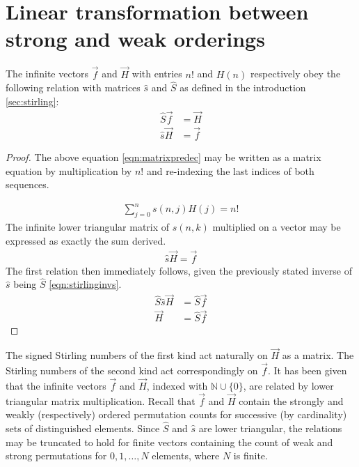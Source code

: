 \documentclass[12pt,reqno]{article}
\begin{document}
\section{Linear transformation between strong and weak orderings}

\begin{corollary}\label{cor:lint}
	The infinite vectors $\vec{f}$ and $\vec{H}$ with entries $n!$ and $H(n)$ respectively obey the following relation with matrices $\hat{s}$ and $\hat{S}$ as defined in the introduction \ref{sec:stirling}:
	\begin{align}
		\hat{S}\vec{f} &= \vec{H}\label{eqn:strongstirling} \\
		\hat{s}\vec{H} &= \vec{f}
	\end{align}

	\begin{proof}
		The above equation \eqref{eqn:matrixpredec} may be written as a matrix equation by multiplication by $n!$ and re-indexing the last indices of both sequences.

		\begin{align}
			\sum_{j = 0}^{n} s(n,j) H(j)  = n!
		\end{align}
		The infinite lower triangular matrix of $s(n,k)$ multiplied on a vector may be expressed as exactly the sum derived.
		\begin{align}
			\hat{s}\vec{H} = \vec{f} \nonumber
		\end{align}
		The first relation then immediately follows, given the previously stated inverse of $\hat{s}$ being $\hat{S}$ \eqref{eqn:stirlinginvs}.
		\begin{align}
			\hat{S}\hat{s}\vec{H} &= \hat{S} \vec{f} \\
			\vec{H} &= \hat{S} \vec{f} \nonumber
		\end{align}
	\end{proof}
\end{corollary}

The signed Stirling numbers of the first kind  act naturally on $\vec{H}$ as a matrix. The Stirling numbers of the second kind act correspondingly on $\vec{f}$. It has been given that the infinite vectors  $\vec{f}$ and $\vec{H}$, indexed with $\mathbb{N} \cup \{0\}$, are related by lower triangular matrix multiplication. Recall that $\vec{f}$ and $\vec{H}$ contain the strongly and weakly (respectively) ordered permutation counts for successive (by cardinality) sets of distinguished elements. Since $\hat{S}$ and $\hat{s}$ are lower triangular, the relations may be truncated to hold for finite vectors containing the count of weak and strong permutations for $0,1,\ldots, N$ elements, where $N$ is finite. 
\end{document}

